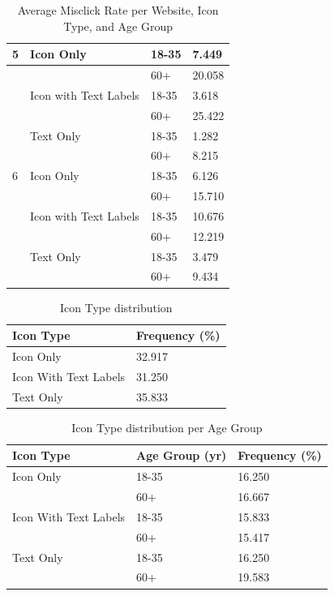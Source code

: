 \documentclass[12pt,twoside]{reedthesis}
\begin{document}
\begin{table}[h!]
\begin{tabular}{| p{2cm} | p{5cm} | p{3cm} | p{3.5cm}|}
        5 & Icon Only & 18-35 & 7.449\\
        \hline
        & & 60+ & 20.058\\
        \hline
        & Icon with Text Labels & 18-35 & 3.618\\
        \hline
        && 60+ & 25.422\\
        \hline
        & Text Only & 18-35 & 1.282\\
        \hline
         && 60+ & 8.215\\
        \hline

        6 & Icon Only & 18-35 & 6.126\\
        \hline
        & & 60+ & 15.710\\
        \hline
        & Icon with Text Labels & 18-35 & 10.676\\
        \hline
        && 60+ & 12.219\\
        \hline
        & Text Only & 18-35 & 3.479\\
        \hline
         && 60+ & 9.434\\
        \hline
    \end{tabular}
    \caption{Average Misclick Rate per Website, Icon Type, and Age Group}
\end{table}

\begin{table}[h!]
    \centering
    \begin{tabular}{| p{5cm} | p{3.5cm} |}
        \hline
        Icon Type & Frequency (\%)\\
        \hline
        Icon Only & 32.917\\
        \hline
        Icon With Text Labels & 31.250\\
        \hline
        Text Only & 35.833\\
        \hline
    \end{tabular}
    \caption{Icon Type distribution}
\end{table}

\begin{table}[h!]
    \centering
    \begin{tabular}{| p{5cm} | p{3.5cm} | p{3.5cm} |}
        \hline
        Icon Type & Age Group (yr) & Frequency (\%)\\
        \hline
        Icon Only & 18-35 & 16.250\\
        \hline
        & 60+ & 16.667\\
        \hline
        Icon With Text Labels & 18-35 & 15.833\\
        \hline
        & 60+ & 15.417\\
        \hline
        Text Only & 18-35 & 16.250\\
        \hline
        & 60+ & 19.583\\
        \hline
    \end{tabular}
    \caption{Icon Type distribution per Age Group}
\end{table}
\end{document}
